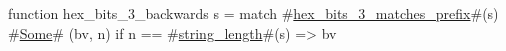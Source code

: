 function hex_bits_3_backwards s =
  match #\hyperref[sailRISCVzhexzybitszy3zymatcheszyprefix]{hex\_bits\_3\_matches\_prefix}#(s) {
      #\hyperref[sailRISCVzSome]{Some}# (bv, n) if n == #\hyperref[sailRISCVzstringzylength]{string\_length}#(s) => bv
  }
